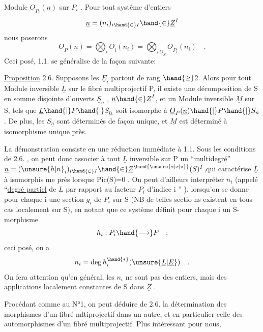 
Module  $\underline{O}_{P_i}(n)$ sur $P_i$ . Pour tout systême d'entiers
\[ \underline{n} = (n_i)_{i \hand{\in} I} \hand{\in} \underline{Z}^I \]
nous  poserons
\[ \underline{O}_P(\underline{n}) = \bigotimes_i \underline{O}_i(n_i) = \bigotimes_{i\,\underline{O}_S} \underline{O}_{P_i}(n_i) \quad . \]
Ceci posé, 1.1. se généralise de la façon suivante:

\uline{Proposition} 2.6. Supposons les $\underline{E}_i$ partout de rang $\hand{\geq}$2. Alors pour tout
Module inversible $\underline{L}$ sur le fibré multiprojectif P, il existe une
 décomposition de S en somme disjointe d'ouverts $\underline{S}_{\underline{n}}$ , $\underline{n} \hand{\in} \underline{Z}^I$,
et  un Module inversible $\underline{M}$ sur S, tels que $\underline{L}\hand{|}P\hand{|}S_{\underline{n}}$
soit isomorphe à $\underline{O}_P(\underline{n})\hand{|}P\hand{|}S_n$ . De plus, les $S_{\underline{n}}$ sont déterminés de façon
unique, et  $\underline{M}$ est déterminé à isomorphisme unique près.

 La démonstration  consiste en une réduction immédiate à 1.1.
Sous les conditions de 2.6. , on peut donc associer à tout $\underline{L}$ inversible
sur P un ``multidegré'' $\underline{n} = (\unsure{h|n}_i)_{i \hand{\in} I} \hand{\in} \underline{Z}^{\hand{\unsure{*|x|z}}}(S)^I$,qui caractérise $\underline{L}$ à isomorphis
me près lorsque Pic(S)=0 . On peut d'ailleurs interpréter $n_i$ (appelé
``\uline{degré partiel} de $\underline{L}$ par rapport au facteur $P_i$ d'indice i '' ), lorsqu'on
se donne pour chaque i une section $g_i$ de $P_i$ sur S (NB de telles sectio
ns existent en tous cas localement sur S), en notant que ce système définit
pour chaque i un S-morphisme 
\[ h_i : P_i \hand{\longrightarrow} P \quad ; \]
ceci posé, on a
\[ n_i = \deg h_i^{\hand{*}}(\unsure{\underline{L}|\underline{E}}) \quad . \]
On fera attention qu'en général, les $n_i$ ne sont pas des entiers, mais des
applications localement constantes de S dans $\underline{Z}$ .

Procédant comme au N°1, on peut déduire de 2.6. la détermination des
morphismes d'un fibré mltiprojectif dans un autre, et en particulier celle
des automorphismes d'un fibré multiprojectif. Plus intéressant pour nous,

